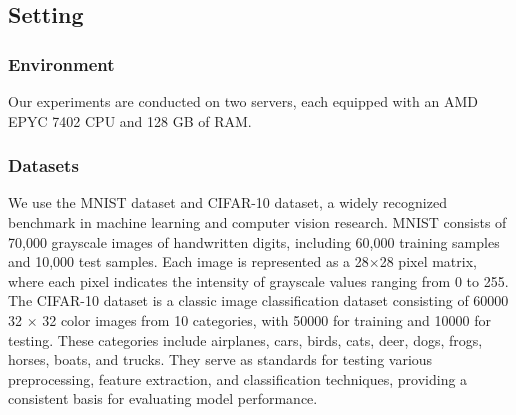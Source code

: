 \documentclass[conference]{IEEEtran}
\begin{document}
\subsection{Setting}
\subsubsection{Environment} Our experiments are conducted on two servers, each equipped with an AMD EPYC 7402 CPU and 128 GB of RAM.






\subsubsection{Datasets} 
We use the MNIST dataset\cite{xiao2017fashion} and CIFAR-10 dataset\cite{krizhevsky2009learning}, a widely recognized benchmark in machine learning and computer vision research. MNIST consists of 70,000 grayscale images of handwritten digits, including 60,000 training samples and 10,000 test samples. Each image is represented as a 28$\times$28 pixel matrix, where each pixel indicates the intensity of grayscale values ranging from 0 to 255. The CIFAR-10 dataset is a classic image classification dataset consisting of 60000 32 × 32 color images from 10 categories, with 50000 for training and 10000 for testing. These categories include airplanes, cars, birds, cats, deer, dogs, frogs, horses, boats, and trucks. 
They serve as standards for testing various preprocessing, feature extraction, and classification techniques, providing a consistent basis for evaluating model performance.
\end{document}
